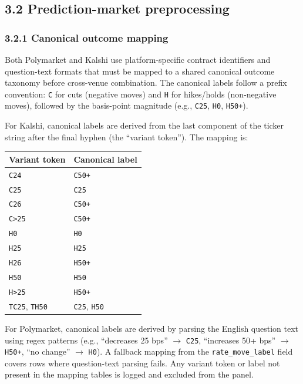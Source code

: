 \subsection*{3.2 Prediction-market preprocessing}

\subsubsection*{3.2.1 Canonical outcome mapping}

Both Polymarket and Kalshi use platform-specific contract identifiers and question-text formats that must be mapped to a shared canonical outcome taxonomy before cross-venue combination. The canonical labels follow a prefix convention: \texttt{C} for cuts (negative moves) and \texttt{H} for hikes/holds (non-negative moves), followed by the basis-point magnitude (e.g., \texttt{C25}, \texttt{H0}, \texttt{H50+}).

For Kalshi, canonical labels are derived from the last component of the ticker string after the final hyphen (the ``variant token''). The mapping is:
\begin{center}
\begin{tabular}{ll}
\hline
Variant token & Canonical label \\
\hline
\texttt{C24} & \texttt{C50+} \\
\texttt{C25} & \texttt{C25} \\
\texttt{C26} & \texttt{C50+} \\
\texttt{C>25} & \texttt{C50+} \\
\texttt{H0} & \texttt{H0} \\
\texttt{H25} & \texttt{H25} \\
\texttt{H26} & \texttt{H50+} \\
\texttt{H50} & \texttt{H50} \\
\texttt{H>25} & \texttt{H50+} \\
\texttt{TC25}, \texttt{TH50} & \texttt{C25}, \texttt{H50} \\
\hline
\end{tabular}
\end{center}

For Polymarket, canonical labels are derived by parsing the English question text using regex patterns (e.g., ``decreases 25 bps'' $\to$ \texttt{C25}, ``increases 50+ bps'' $\to$ \texttt{H50+}, ``no change'' $\to$ \texttt{H0}). A fallback mapping from the \texttt{rate\_move\_label} field covers rows where question-text parsing fails. Any variant token or label not present in the mapping tables is logged and excluded from the panel.

